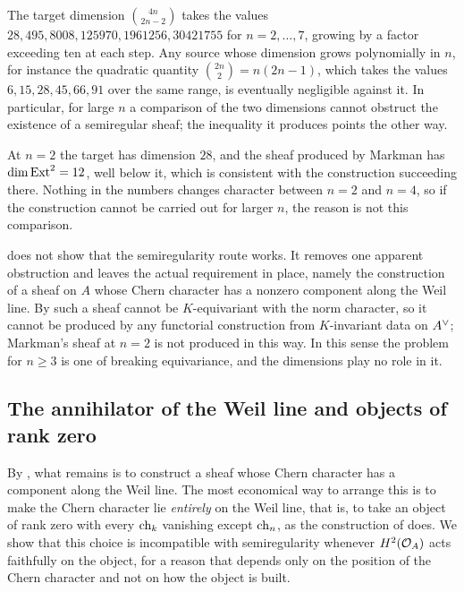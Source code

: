 \begin{corollary}\label{cor:countnotbind}
The target dimension $\binom{4n}{2n-2}$ takes the values
$28,495,8008,125970,1961256,30421755$ for $n=2,\dots,7$, growing by a factor
exceeding ten at each step. Any source whose dimension grows polynomially in
$n$, for instance the quadratic quantity $\binom{2n}{2}=n(2n-1)$, which takes
the values $6,15,28,45,66,91$ over the same range, is eventually negligible
against it. In particular, for large $n$ a comparison of the two dimensions
cannot obstruct the existence of a semiregular sheaf; the inequality it
produces points the other way.
\end{corollary}

\begin{remark}[Consistency at $n=2$]\label{rem:markmanconsistent}
At $n=2$ the target has dimension $28$, and the sheaf produced by Markman has
$\dim\operatorname{Ext}^{2}=12$, well below it, which is consistent with the construction
succeeding there. Nothing in the numbers changes character between $n=2$ and
$n=4$, so if the construction cannot be carried out for larger $n$, the reason
is not this comparison.
\end{remark}

\begin{remark}\label{rem:semiregneed}
 does not show that the semiregularity route works.
It removes one apparent obstruction and leaves the actual requirement in
place, namely the construction of a sheaf on $A$ whose Chern character has a
nonzero component along the Weil line. By  such a sheaf
cannot be $K$-equivariant with the norm character, so it cannot be produced
by any functorial construction from $K$-invariant data on $A^{\vee}$; Markman's
sheaf at $n=2$ is not produced in this way. In this sense the problem for
$n\ge3$ is one of breaking equivariance, and the dimensions play no role in
it.
\end{remark}

\subsection{The annihilator of the Weil line and objects of rank zero}
\label{ssec:rankzero}

By , what remains is to construct a sheaf whose Chern
character has a component along the Weil line. The most economical way to
arrange this is to make the Chern character lie \emph{entirely} on the Weil
line, that is, to take an object of rank zero with every $\operatorname{ch}_{k}$ vanishing
except $\operatorname{ch}_{n}$, as the construction of  does. We show
that this choice is incompatible with semiregularity whenever $H^{2}(\mathcal{O}_{A})$
acts faithfully on the object, for a reason that depends only on the position
of the Chern character and not on how the object is built.

